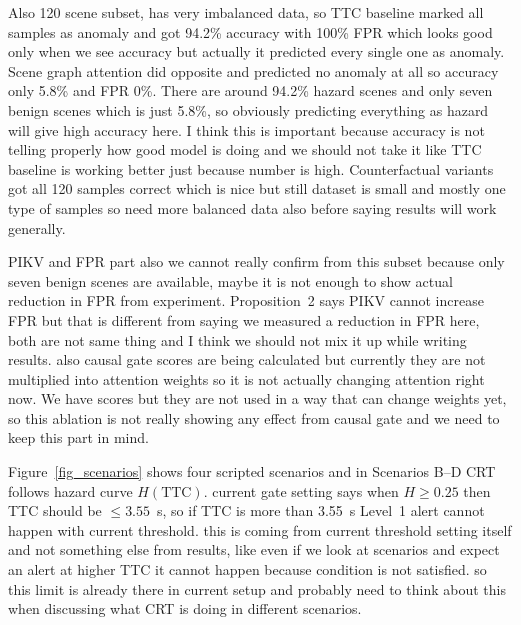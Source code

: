 \documentclass[preprint,12pt]{elsarticle}
\begin{document}
Also 120 scene subset, has very imbalanced data, so TTC baseline marked all samples as anomaly and got 94.2\% accuracy with 100\% FPR which looks good only when we see accuracy but actually it predicted every single one as anomaly. Scene graph attention did opposite and predicted no anomaly at all so accuracy only 5.8\% and FPR 0\%. There are around 94.2\% hazard scenes and only seven benign scenes which is just 5.8\%, so obviously predicting everything as hazard will give high accuracy here. I think this is important because accuracy is not telling properly how good model is doing and we should not take it like TTC baseline is working better just because number is high. Counterfactual variants got all 120 samples correct which is nice but still dataset is small and mostly one type of samples so need more balanced data also before saying results will work generally.

PIKV and FPR part also we cannot really confirm from this subset because only seven benign scenes are available, maybe it is not enough to show actual reduction in FPR from experiment. Proposition~2 says PIKV cannot increase FPR but that is different from saying we measured a reduction in FPR here, both are not same thing and I think we should not mix it up while writing results. also causal gate scores are being calculated but currently they are not multiplied into attention weights so it is not actually changing attention right now. We have scores but they are not used in a way that can change weights yet, so this ablation is not really showing any effect from causal gate and we need to keep this part in mind.

Figure~\ref{fig_scenarios} shows four scripted scenarios and in Scenarios B--D CRT follows hazard curve $H(\text{TTC})$. current gate setting says when $H \ge 0.25$ then TTC should be $\le 3.55$~s, so if TTC is more than 3.55~s Level~1 alert cannot happen with current threshold. this is coming from current threshold setting itself and not something else from results, like even if we look at scenarios and expect an alert at higher TTC it cannot happen because condition is not satisfied. so this limit is already there in current setup and probably need to think about this when discussing what CRT is doing in different scenarios.
\end{document}
